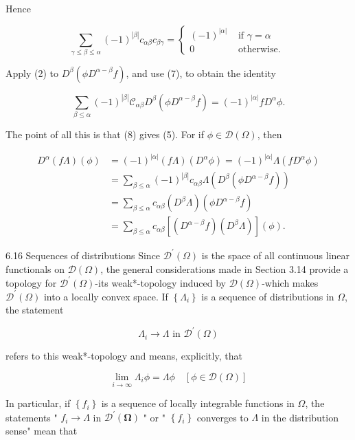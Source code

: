 \documentclass[10pt]{article}
\begin{document}
Hence

$$
\sum_{\gamma \leq \beta \leq \alpha}(-1)^{|\beta|} c_{\alpha \beta} c_{\beta \gamma}= \begin{cases}(-1)^{|\alpha|} & \text { if } \gamma=\alpha \\ 0 & \text { otherwise. }\end{cases}
$$

Apply (2) to $D^{\beta}\left(\phi D^{\alpha-\beta} f\right)$, and use (7), to obtain the identity

$$
\sum_{\beta \leq \alpha}(-1)^{|\beta|} \mathcal{C}_{\alpha \beta} D^{\beta}\left(\phi D^{\alpha-\beta} f\right)=(-1)^{|\alpha|} f D^{\alpha} \phi .
$$

The point of all this is that (8) gives (5). For if $\phi \in \mathscr{D}(\Omega)$, then

$$
\begin{aligned}
D^{\alpha}(f \Lambda)(\phi) & =(-1)^{|\alpha|}(f \Lambda)\left(D^{\alpha} \phi\right)=(-1)^{|\alpha|} \Lambda\left(f D^{\alpha} \phi\right) \\
& =\sum_{\beta \leq \alpha}(-1)^{|\beta|} c_{\alpha \beta} \Lambda\left(D^{\beta}\left(\phi D^{\alpha-\beta} f\right)\right) \\
& =\sum_{\beta \leq \alpha} c_{\alpha \beta}\left(D^{\beta} \Lambda\right)\left(\phi D^{\alpha-\beta} f\right) \\
& =\sum_{\beta \leq \alpha} c_{\alpha \beta}\left[\left(D^{\alpha-\beta} f\right)\left(D^{\beta} \Lambda\right)\right](\phi) .
\end{aligned}
$$

6.16 Sequences of distributions Since $\mathscr{D}^{\prime}(\Omega)$ is the space of all continuous linear functionals on $\mathscr{D}(\Omega)$, the general considerations made in Section 3.14 provide a topology for $\mathscr{D}^{\prime}(\Omega)$-its weak*-topology induced by $\mathscr{D}(\Omega)$-which makes $\mathscr{D}^{\prime}(\Omega)$ into a locally convex space. If $\left\{\Lambda_{i}\right\}$ is a sequence of distributions in $\Omega$, the statement

$$
\Lambda_{i} \rightarrow \Lambda \text { in } \mathscr{D}^{\prime}(\Omega)
$$

refers to this weak*-topology and means, explicitly, that

$$
\lim _{i \rightarrow \infty} \Lambda_{i} \phi=\Lambda \phi \quad[\phi \in \mathscr{D}(\Omega)]
$$

In particular, if $\left\{f_{i}\right\}$ is a sequence of locally integrable functions in $\Omega$, the statements " $f_{i} \rightarrow \Lambda$ in $\mathscr{D}^{\prime}(\boldsymbol{\Omega})$ " or " $\left\{f_{i}\right\}$ converges to $\Lambda$ in the distribution sense" mean that
\end{document}
